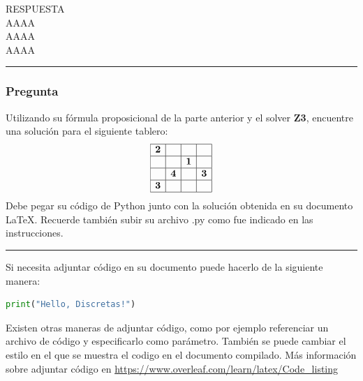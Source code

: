 \documentclass[12pt]{article}
\begin{document}
RESPUESTA\\AAAA\\AAAA\\AAAA

\rule{\linewidth}{0.4pt} %

\subsubsection*{Pregunta }

Utilizando su fórmula proposicional de la parte anterior y el solver \textbf{Z3}, encuentre una
solución para el siguiente tablero:
\[
\begin{array}{|c|c|c|c|} \hline
\textbf{2} & & &  \\ \hline
 & & \textbf{1} & \\ \hline
 & \textbf{4} & & \textbf{3} \\ \hline
\textbf{3} &  &  & \\ \hline
\end{array}
\]
Debe pegar su código de Python junto con la solución obtenida en su documento LaTeX. Recuerde también
subir su archivo .py como fue indicado en las instrucciones.

\rule{\linewidth}{0.4pt} %




Si necesita adjuntar código en su documento puede hacerlo de la siguiente manera:

\begin{lstlisting}[language=Python]
print("Hello, Discretas!")
\end{lstlisting}

Existen otras maneras de adjuntar código, como por ejemplo referenciar un archivo de código y especificarlo como parámetro. También se puede cambiar el estilo en el que se muestra el codigo en el documento compilado. Más información sobre adjuntar código en \href{https://www.overleaf.com/learn/latex/Code_listing}{https://www.overleaf.com/learn/latex/Code\_listing}







\end{document}
